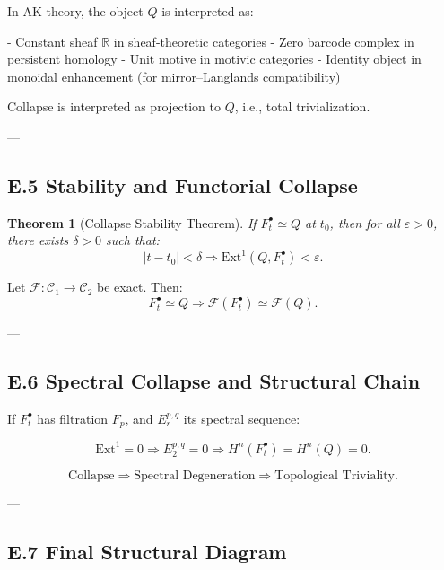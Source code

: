 \documentclass[11pt]{article}
\newtheorem{theorem}{Theorem}[section]
\begin{document}
In AK theory, the object $Q$ is interpreted as:

- Constant sheaf $\underline{\mathbb{R}}$ in sheaf-theoretic categories
- Zero barcode complex in persistent homology
- Unit motive in motivic categories
- Identity object in monoidal enhancement (for mirror–Langlands compatibility)

Collapse is interpreted as projection to $Q$, i.e., total trivialization.

---

\subsection*{E.5 Stability and Functorial Collapse}

\begin{theorem}[Collapse Stability Theorem]
If $F^\bullet_t \simeq Q$ at $t_0$, then for all $\varepsilon > 0$, there exists $\delta > 0$ such that:
\[
|t - t_0| < \delta \Rightarrow \mathrm{Ext}^1(Q, F^\bullet_t) < \varepsilon.
\]
\end{theorem}

\begin{proposition}[Functoriality]
Let $\mathcal{F} : \mathcal{C}_1 \to \mathcal{C}_2$ be exact. Then:
\[
F^\bullet_t \simeq Q \Rightarrow \mathcal{F}(F^\bullet_t) \simeq \mathcal{F}(Q).
\]
\end{proposition}

---

\subsection*{E.6 Spectral Collapse and Structural Chain}

If $F^\bullet_t$ has filtration $F_p$, and $E_r^{p,q}$ its spectral sequence:

\[
\mathrm{Ext}^1 = 0 \Rightarrow E_2^{p,q} = 0 \Rightarrow H^n(F^\bullet_t) = H^n(Q) = 0.
\]

\[
\text{Collapse} \Rightarrow \text{Spectral Degeneration} \Rightarrow \text{Topological Triviality}.
\]

---

\subsection*{E.7 Final Structural Diagram}

\begin{center}
\end{center}
\end{document}
